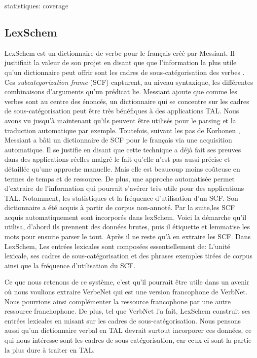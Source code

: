 statistiques: coverage

\subsection{LexSchem}
LexSchem est un dictionnaire de verbe pour le français créé par Messiant. Il jusitifiait la valeur de son projet en disant que  que l'information la plus utile qu'un dictionnaire peut offrir sont les cadres de sous-catégorisation des verbes \citep{MESSIANT08.142}. Ces \emph{subcategorization frame} (SCF) capturent, au niveau syntaxique, les différentes combinaisons d'arguments qu'un prédicat lie. Messiant ajoute que comme les verbes sont au centre des énoncés, un dictionnaire qui se concentre sur les cadres de sous-catégorisation peut être très bénéfiques à des applications TAL.  Nous avons vu jusqu'à maintenant qu'ils peuvent être utilisés pour le parsing et la traduction automatique par exemple. Toutefois, suivant les pas de Korhonen \citep{Korhonenlargesubcategorizationlexicon2006}, Messiant a bâti un dictionnaire de SCF pour le français via une acquisition automatique. Il se justifie en disant que cette technique a déjà fait ses preuves dans des applications réelles malgré le fait qu'elle n'est pas aussi précise et détaillée qu'une approche manuelle. Mais elle est beaucoup moins coûteuse en termes de temps et de ressource. De plus, une approche automatisée permet d'extraire de l'information qui pourrait s'avérer très utile pour des applications TAL. Notamment, les statistiques et la fréquence d'utilisation d'un SCF.  Son dictionnaire a été acquis à partir de corpus non-annoté. Par la suite,les SCF acquis automatiquement sont incorporés dans lexSchem. Voici la démarche qu'il utilisa, d'abord ils prennent des données brutes, puis il étiquette et lemmatise les mots  pour ensuite parser le tout. Après il ne reste qu'à en extraire les SCF. Dans LexSchem, Les entrées lexicales sont composées essentiellement de: L'unité lexicale, ses cadres de sous-catégorisation et des phrases exemples tirées de corpus ainsi que la fréquence d'utilisation du SCF.

Ce que nous retenons de ce système, c'est qu'il pourrait être utile dans un avenir où nous voulions extraire VerbeNet qui est une version francophone de VerbNet. Nous pourrions ainsi complémenter la ressource francophone par une autre ressource franchophone. De plus, tel que VerbNet l'a fait, LexSchem construit ses entrées lexicales en misant sur les cadres de sous-catégorisation. Nous pensons aussi qu'un dictionnaire verbal en TAL devrait surtout incorporer ces données, ce qui nous intéresse sont les cadres de sous-catégorisation, car ceux-ci sont la partie la plus dure à traiter en TAL.

